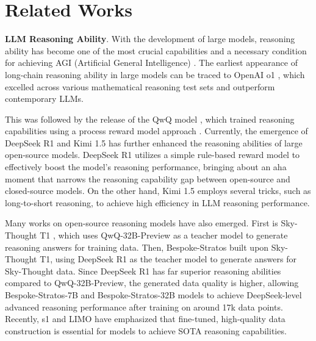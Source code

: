 \section{Related Works}
\textbf{LLM Reasoning Ability}. With the development of large models, reasoning ability \cite{wang2022self,zhang2023multimodal,yao2023tree,plaat2024reasoning} has become one of the most crucial capabilities and a necessary condition for achieving AGI (Artificial General Intelligence) 
\cite{minaee2024large,xu2024survey,morris2023levels,feng2024far,krishnan2025artificial}. The earliest appearance of long-chain reasoning ability in large models can be traced to OpenAI o1 \cite{jaech2024openai, arrieta2025o3,hurst2024gpt}, which excelled across various mathematical reasoning test sets and outperform contemporary LLMs.

This was followed by the release of the QwQ model \cite{qwen2.5, bai2023qwen, bai2023qwens, chu2024qwen2}, which trained reasoning capabilities using a process reward model approach \cite{li2024process, ma2023let, zhang2025lessons, lambert2024rewardbench}. Currently, the emergence of DeepSeek R1 \cite{deepseekai2025deepseekr1incentivizingreasoningcapability} and Kimi 1.5 \cite{kimiteam2025kimik15scalingreinforcement} has further enhanced the reasoning abilities of large open-source models. DeepSeek R1 utilizes a simple rule-based reward model \cite{ramesh2024group,hu2025reinforce++, shao2024deepseekmath, alonso2025mathematics, kirk2023understanding, yang2024bayesian} to effectively boost the model’s reasoning performance, bringing about an aha moment that narrows the reasoning capability gap between open-source and closed-source models. On the other hand, Kimi 1.5 employs several tricks, such as long-to-short reasoning, to achieve high efficiency in LLM reasoning performance.

Many works on open-source reasoning models have also emerged. First is Sky-Thought T1 \cite{sky_t1_2025}, which uses QwQ-32B-Preview as a teacher model to generate reasoning answers for training data. Then, Bespoke-Stratos \cite{bespoke_stratos} built upon Sky-Thought T1, using DeepSeek R1 as the teacher model to generate answers for Sky-Thought data. Since DeepSeek R1 has far superior reasoning abilities compared to QwQ-32B-Preview, the generated data quality is higher, allowing Bespoke-Stratos-7B and Bespoke-Stratos-32B models to achieve DeepSeek-level advanced reasoning performance after training on around 17k data points. Recently, s1 \cite{muennighoff2025s1simpletesttimescaling} and LIMO \cite{ye2025limoreasoning} have emphasized that fine-tuned, high-quality data construction is essential for models to achieve SOTA reasoning capabilities. 

